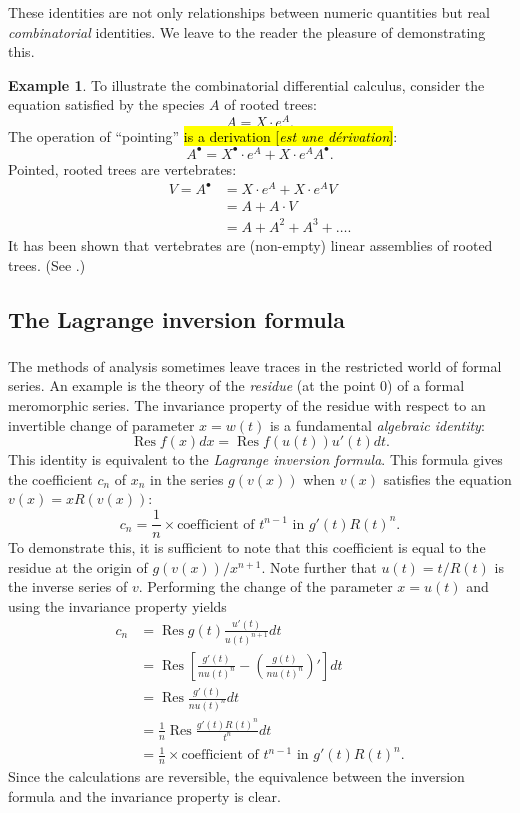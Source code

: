 \documentclass{amsart}
\theoremstyle{definition}
\newtheorem{ex}{Example}
\theoremstyle{remark}
\newcommand{\trans}[2]{\hl{#1 [\textit{#2}]}}
\DeclareMathOperator{\Res}{Res}
\newcommand{\term}[1]{\emph{#1}}
\newcommand{\pointed}[1]{#1^{\bullet}}
\newcommand{\pref}[1]{\prettyref{#1}}
\begin{document}
These identities are not only relationships between numeric quantities
but real \emph{combinatorial} identities. We leave to
the reader the pleasure of demonstrating this.

\begin{ex} \label{ex:trees-vertebrates}
To illustrate the combinatorial differential calculus,
consider the equation satisfied by the species $A$ of rooted trees:
\[ A = X \cdot e^A. \] The operation of ``pointing'' \trans{is a
  derivation}{est une d\'erivation}:
\[ \pointed A = \pointed X \cdot e^A + X \cdot e^A \pointed A. \]
Pointed, rooted trees are vertebrates:
\begin{align*}
V = \pointed A &= X \cdot e^A + X \cdot e^A V \\
&= A + A \cdot V \\
&= A + A^2 + A^3 + \dots .
\end{align*}
It has been shown that vertebrates are (non-empty) linear assemblies
of rooted trees. (See \pref{ex:vertebrate}.)
\end{ex}

\subsection{The Lagrange inversion formula}

\subsubsection{}
The methods of analysis sometimes leave traces in
the restricted world of formal series. An example is the theory of the \term{residue}
(at the point $0$) of a formal meromorphic series. The invariance property
of the residue with respect to an invertible change of parameter $x = w (t)$ is
a fundamental \emph{algebraic identity}:
\[ \Res f (x) dx = \Res f(u (t)) u' (t) dt. \]
This identity is equivalent to the \term{Lagrange inversion formula}. This
formula gives the coefficient $c_n$ of $x_n$ in the series $g (v (x))$ when $v (x)$
satisfies the equation $v (x) = xR(v (x))$:
\[ c_n = \frac{1}{n} \times \text{coefficient of $t^{n-1}$ in
  $g'(t)R(t)^n$}. \] To demonstrate this, it is sufficient to note
that this coefficient is equal to the residue at the origin of $g (v
(x))/x^{n+1}$. Note further that $u (t) = t / R (t)$ is the inverse
series of $v$. Performing the change of the parameter $x = u (t)$ and
using the invariance property yields
\begin{align*}
c_n &= \Res g(t) \frac{u'(t)}{u(t)^{n+1}} dt \\
&= \Res \left[ \frac{g'(t)}{nu(t)^n} - \left( \frac{g(t)}{nu(t)^n}\right)' \right] dt \\
&= \Res \frac{g'(t)}{nu(t)^n} dt \\
&= \frac{1}{n} \Res \frac{g'(t) R(t)^n}{t^n} dt \\
&= \frac{1}{n} \times \text{coefficient of $t^{n-1}$ in $g'(t) R(t)^n$}.
\end{align*}
Since the calculations are reversible, the equivalence between the inversion formula
and the invariance property is clear.
\end{document}
